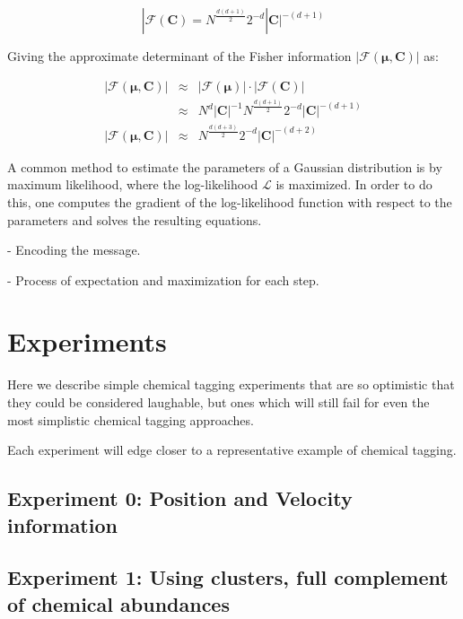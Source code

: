 \documentclass{aastex61}
\begin{document}
\begin{equation}
|\mathcal{F}\left(\bm{C}\right) = N^\frac{d(d+1)}{2}2^{-d}|\bm{C}|^{-(d+1)}
\end{equation}

Giving the approximate determinant of the Fisher information $|\mathcal{F}\left(\bm{\mu},\bm{C}\right)|$ as:

\begin{eqnarray}
  |\mathcal{F}\left(\bm{\mu},\bm{C}\right)| & \approx & |\mathcal{F}\left(\bm{\mu}\right)|\cdot|\mathcal{F}\left(\bm{C}\right)| \\
  & \approx & N^{d}|\bm{C}|^{-1}N^\frac{d(d+1)}{2}2^{-d}|\bm{C}|^{-(d+1)} \\
  |\mathcal{F}\left(\bm{\mu},\bm{C}\right)| & \approx & N^\frac{d(d+3)}{2}2^{-d}|\bm{C}|^{-(d+2)}
\end{eqnarray}





A common method to estimate the parameters of a Gaussian distribution is by
maximum likelihood, where the log-likelihood $\mathcal{L}$ is maximized. In
order to do this, one computes the gradient of the log-likelihood function
with respect to the parameters and solves the resulting equations.


- Encoding the message.


- Process of expectation and maximization for each step.


\section{Experiments}
\label{sec:experiments}

Here we describe simple chemical tagging experiments that are so optimistic
that they could be considered laughable, but ones which will still fail for
even the most simplistic chemical tagging approaches.

Each experiment will edge closer to a representative example of chemical
tagging.

\subsection{Experiment 0: Position and Velocity information}

\subsection{Experiment 1: Using clusters, full complement of chemical abundances}
\end{document}

